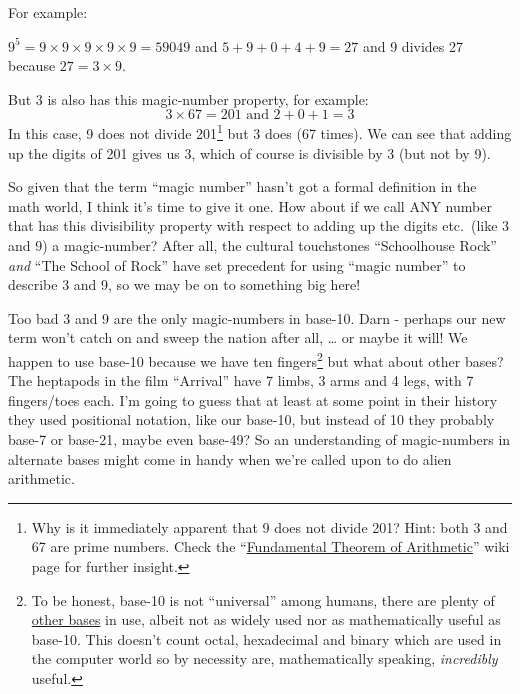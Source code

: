 \documentclass{article}
\newenvironment{jprIn}{\begin{adjustwidth}{2em}{}}{\end{adjustwidth}}
\begin{document}
For example:
\begin{jprIn}
$9^5=9\times{}9\times{}9\times{}9\times{}9=59049$
and $5+9+0+4+9=27$ and 9 divides 27 because $27 = 3\times{}9$.
\end{jprIn}

But 3 is also has this magic-number property, for example:
\[ 3\times{}67=201 \text{ and } 2+0+1=3\]
In this case, 9 does not divide 201\footnote{Why is it immediately
apparent that 9 does not divide 201? Hint: both 3 and 67 are prime numbers.
Check the ``\href{https://en.wikipedia.org/wiki/Fundamental_theorem_of_arithmetic}{Fundamental
Theorem of Arithmetic}'' wiki page for further insight.}
but 3 does (67 times).
We can see that adding up the digits of 201 gives us 3,
which of course is divisible by 3 (but not by 9).

So given that the term ``magic number'' hasn't got
a formal definition in the math world, I think it's time to give it one.
How about if we call ANY number that has this
divisibility property with respect to adding up the digits etc.\ (like 3 and 9) a magic-number?
After all, the cultural touchstones
``Schoolhouse Rock'' \emph{and} ``The School of Rock''
have set precedent for using
``magic number'' to describe 3 and 9, so we may be on to something big here!

Too bad 3 and 9 are the only magic-numbers in base-10.
Darn - perhaps our new term won't catch on and sweep the nation after all, \dots{} or 
maybe it will!
We happen to use base-10 because we have ten fingers\footnote{To be honest, base-10 is
not ``universal'' among humans, there are plenty of
\href{https://www.youtube.com/watch?v=l4bmZ1gRqCc}{other bases} in use, albeit not
as widely used nor as mathematically useful as base-10. This doesn't count
octal, hexadecimal and binary which are used in the computer world
so by necessity are, mathematically speaking, \emph{incredibly} useful.} but what about other bases?
The heptapods in the film ``Arrival'' have 7 limbs, 3 arms and 4 legs, with 7 fingers/toes each.
I'm going to guess that at least at some point in their history they used positional
notation, like our base-10, but instead of 10 they probably base-7 or base-21,
maybe even base-49? So an understanding of magic-numbers in alternate
bases might come in handy when we're called upon to do alien arithmetic.
\end{document}
